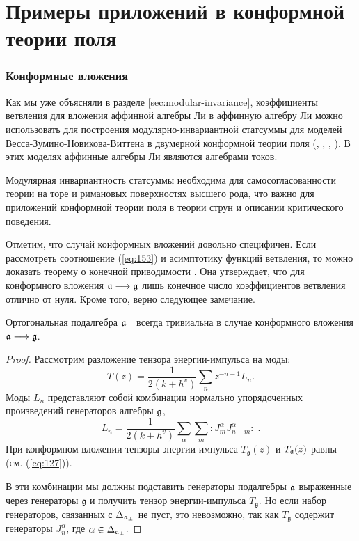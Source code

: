 \section{Примеры приложений в конформной теории поля}
\label{sec:phys-appl}

\subsubsection{Конформные вложения}
\label{sec:conformal-embeddings}

Как мы уже объясняли в разделе \ref{sec:modular-invariance}, коэффициенты ветвления для вложения аффинной алгебры Ли в аффинную алгебру Ли можно использовать для построения модулярно-инвариантной статсуммы для моделей Весса-Зумино-Новикова-Виттена в двумерной конформной теории поля (\cite{difrancesco1997cft}, \cite{Walton:1999xc}, \cite{walton1989conformal}, \cite{schellekens1986conformal}).
В этих моделях аффинные алгебры Ли являются алгебрами токов. 

Модулярная инвариантность статсуммы необходима для самосогласованности теории на торе и римановых поверхностях высшего рода, что важно для приложений конформной теории поля в теории струн и описании критического поведения.

Отметим, что случай конформных вложений довольно специфичен. Если рассмотреть соотношение (\ref{eq:153}) и асимптотику функций ветвления, то можно доказать теорему о конечной приводимости \cite{kac1988modular}. Она утверждает, что для конформного вложения  $\mathfrak{a}\longrightarrow\mathfrak{g}$ лишь конечное число коэффициентов ветвления отлично от нуля. Кроме того, верно следующее замечание. 

\begin{mynote} Ортогональная подалгебра  $\mathfrak{a}_{\perp}$ всегда тривиальна в случае конформного вложения $\mathfrak{a}\longrightarrow \mathfrak{g}$.
\begin{proof}
Рассмотрим разложение тензора энергии-импульса на моды:
\begin{equation*}
\label{eq:47}
  T(z)=\frac{1}{2(k+h^v)}\sum_n z^{-n-1}L_n.
\end{equation*}
Моды $L_n$ представляют собой комбинации нормально упорядоченных произведений генераторов алгебры $\mathfrak{g}$,
\begin{equation*}
\label{eq:48}
  L_n=\frac{1}{2(k+h^v)}\sum_{\alpha}\sum_m:J^{\alpha}_m J^{\alpha}_{n-m}: \; .
\end{equation*}
При конформном вложении тензоры энергии-импульса  $T_{\mathfrak{g}}(z)$ и $T_{\mathfrak{a}}(z)$ равны (см. (\ref{eq:127})).

В эти комбинации мы должны подставить генераторы подалгебры $\mathfrak{a}$ выраженные через генераторы $\mathfrak{g}$ и получить тензор энергии-импульса $T_{\mathfrak{g}}$. Но если набор генераторов, связанных с  $\Delta_{\mathfrak{a}_{\perp}}$ не пуст, это невозможно, так как  $T_{\mathfrak{g}}$ содержит генераторы $J^{\alpha}_n$, где $\alpha\in \Delta_{\mathfrak{a}_{\perp}}$.
\end{proof}
\end{mynote}



